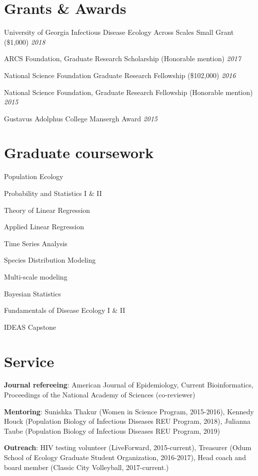 \documentclass[letterpaper]{article}
\renewenvironment{itemize}{
  \begin{list}{}{
    \setlength{\leftmargin}{1.5em}
  }
}{
  \end{list}
}
\begin{document}
\section*{Grants \& Awards}
\begin{itemize}
\item University of Georgia Infectious Disease Ecology Across Scales Small Grant (\$1,000) \hfill \textit{2018} 
\item ARCS Foundation, Graduate Research Scholarship (Honorable mention) \hfill \textit{2017} 
\item National Science Foundation Graduate Research Fellowship (\$102,000) \hfill \textit{2016} 
\item National Science Foundation, Graduate Research Fellowship (Honorable mention) \hfill \textit{2015} 
\item Gustavus Adolphus College Mansergh Award \hfill \textit{2015} 
\end{itemize}

\section*{Graduate coursework}
\begin{multicols}{2}
\begin{itemize}
\item Population Ecology
\item Probability and Statistics I \& II
\item Theory of Linear Regression
\item Applied Linear Regression
\item Time Series Analysis 
\item Species Distribution Modeling
\item Multi-scale modeling
\item Bayesian Statistics
\item Fundamentals of Disease Ecology I \& II
\item IDEAS Capstone 
\end{itemize}
\end{multicols}

\section*{Service}
\begin{itemize}
\item \textbf{Journal refereeing}: American Journal of Epidemiology, Current Bioinformatics, Proceedings of the National Academy of Sciences (co-reviewer)
\item \textbf{Mentoring}: Sunishka Thakur (Women in Science Program, 2015-2016), Kennedy Houck (Population Biology of Infectious Diseases REU Program, 2018), Julianna Taube (Population Biology of Infectious Diseases REU Program, 2019)
\item \textbf{Outreach}: HIV testing volunteer (LiveForward, 2015-current),  Treasurer (Odum School of Ecology Graduate Student Organization, 2016-2017), Head coach and board member (Classic City Volleyball, 2017-current.) 
\end{itemize}
\end{document}
